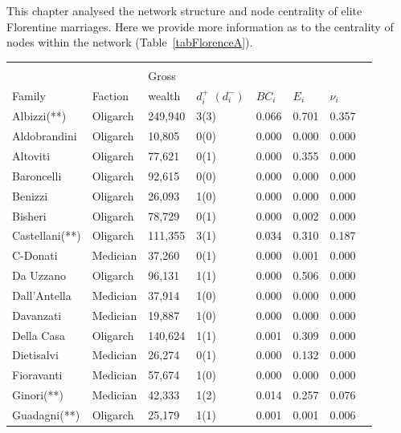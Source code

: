 \documentclass[11pt,fleqn]{article}
\begin{document}
This chapter analysed the network structure and node centrality of elite Florentine marriages. Here we provide more information as to the centrality of nodes within the network (Table~\ref{tabFlorenceA}).

\begin{table}
\begin{center}
\begin{tabu} to \textwidth {X[l]  X[c]  X[c]  X[c]  X[c]  X[c]	X[c]  X[c]}
\\[-1.8ex]\hline
\hline \\[-1.8ex]
       			&   		& Gross  &  &  &  & \\
Family 			& Faction	& wealth & $d^+_i$ $\left(d^-_i\right)$ & $BC_i$	&  $E_i$	&  $\nu_i$	\\ \hline
Albizzi(**)     & Oligarch	& 249,940 	& 3(3) & 0.066 & 0.701 & 0.357      \\
Aldobrandini    & Oligarch	& 10,805  	& 0(0) & 0.000 & 0.000 & 0.000      \\
Altoviti        & Oligarch	& 77,621  	& 0(1) & 0.000 & 0.355 & 0.000      \\
Baroncelli      & Oligarch	& 92,615  	& 0(0) & 0.000 & 0.000 & 0.000      \\
Benizzi         & Oligarch	& 26,093  	& 1(0) & 0.000 & 0.000 & 0.000      \\
Bisheri         & Oligarch	& 78,729  	& 0(1) & 0.000 & 0.002 & 0.000      \\
Castellani(**)  & Oligarch	& 111,355 	& 3(1) & 0.034 & 0.310 & 0.187      \\
C-Donati        & Medician	& 37,260  	& 0(1) & 0.000 & 0.001 & 0.000      \\
Da Uzzano       & Oligarch	& 96,131  	& 1(1) & 0.000 & 0.506 & 0.000      \\
Dall'Antella    & Medician	& 37,914  	& 1(0) & 0.000 & 0.000 & 0.000      \\
Davanzati       & Medician	& 19,887  	& 1(0) & 0.000 & 0.000 & 0.000      \\
Della Casa      & Oligarch	& 140,624 	& 1(1) & 0.001 & 0.309 & 0.000      \\
Dietisalvi      & Medician	& 26,274  	& 0(1) & 0.000 & 0.132 & 0.000      \\
Fioravanti      & Medician	& 57,674  	& 1(0) & 0.000 & 0.000 & 0.000      \\
Ginori(**)      & Medician	& 42,333  	& 1(2) & 0.014 & 0.257 & 0.076      \\
Guadagni(**)    & Oligarch	& 25,179  	& 1(1) & 0.001 & 0.001 & 0.006      \\

\end{tabu}
\end{center}
\end{table}
\end{document}
